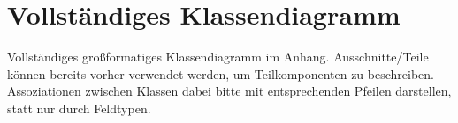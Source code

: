 \section{Vollständiges Klassendiagramm}
Vollständiges großformatiges Klassendiagramm im Anhang. Ausschnitte/Teile können bereits vorher verwendet werden, um Teilkomponenten zu beschreiben. Assoziationen zwischen Klassen dabei bitte mit entsprechenden Pfeilen darstellen, statt nur durch Feldtypen.
